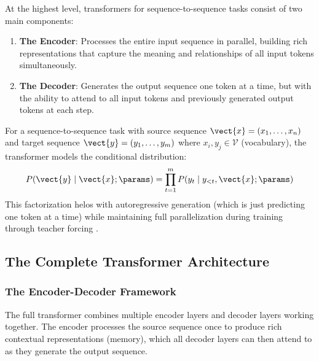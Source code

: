 At the highest level, transformers for sequence-to-sequence tasks consist of two main components:

\begin{enumerate}
  \item \textbf{The Encoder}: Processes the entire input sequence in parallel, building rich representations that capture the meaning and relationships of all input tokens simultaneously.
  \item \textbf{The Decoder}: Generates the output sequence one token at a time, but with the ability to attend to all input tokens and previously generated output tokens at each step.
\end{enumerate}

For a sequence-to-sequence task with source sequence $\vect{x} = (x_1, \ldots, x_n)$ and target sequence $\vect{y} = (y_1, \ldots, y_m)$ where $x_i, y_j \in \mathcal{V}$ (vocabulary), the transformer models the conditional distribution:
\begin{equation}
  P(\vect{y} \mid \vect{x}; \params) = \prod_{t=1}^m P(y_t \mid y_{<t}, \vect{x}; \params)
\end{equation}
This factorization helos with autoregressive generation (which is just predicting one token at a time) while maintaining full parallelization during training through teacher forcing \cite{Graves2013}.

\subsection{The Complete Transformer Architecture}

\subsubsection{The Encoder-Decoder Framework}

The full transformer combines multiple encoder layers and decoder layers working together. The encoder processes the source sequence once to produce rich contextual representations (memory), which all decoder layers can then attend to as they generate the output sequence.

